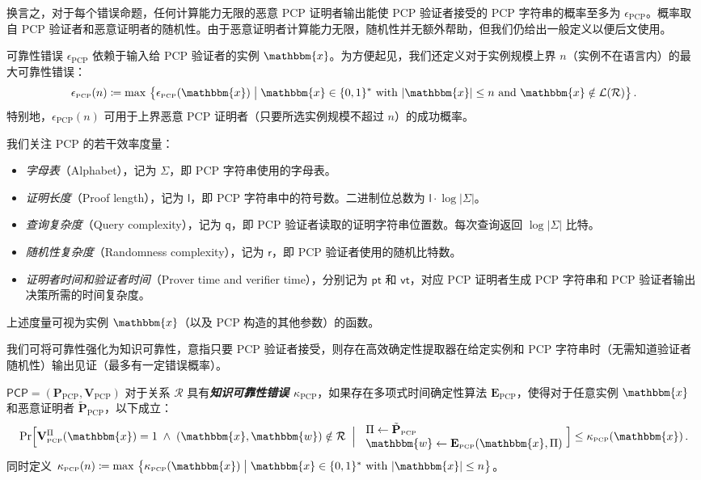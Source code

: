 \documentclass[american,singlepageview]{snargs-book-zh}
\renewcommand{\enspace}{\ensuremath{\thinspace}}
\newcommand{\defemph}[1]{\textbf{\emph{#1}}}
\newcommand{\Bits}{\{0,1\}}
\newcommand{\Malicious}[1]{\tilde{#1}}
\newcommand{\DefineEqual}{\coloneqq}
\newcommand{\StateExperiment}[1]{
\!\begin{array}{l}
#1
\end{array}\!}
\newcommand{\Cardinality}[1]{\left|{#1}\right|}
\newcommand{\SomeSize}[1]{|#1|}
\newcommand{\Relation}{\mathcal{R}}
\newcommand{\Language}{\mathcal{L}}
\newcommand{\GetLanguage}[1]{\Language(#1)}
\newcommand{\Instance}{\mathbbm{x}}
\newcommand{\Witness}{\mathbbm{w}}
\newcommand{\InstanceSize}{n}
\newcommand{\ProtoProver}{P}
\newcommand{\ProtoVerifier}{V}
\newcommand{\ProtoExtractor}{E}
\newcommand{\ProtoSoundnessError}{\epsilon}
\newcommand{\ProtoKnowledgeError}{\kappa}
\newcommand{\ProtoAlphabet}{\Sigma}
\newcommand{\ProtoProofLength}{\mathsf{l}}
\newcommand{\ProtoQueryComplexity}{\mathsf{q}}
\newcommand{\ProtoRandomnessComplexity}{\mathsf{r}}
\newcommand{\ProtoProverTime}{\mathsf{pt}}
\newcommand{\ProtoVerifierTime}{\mathsf{vt}}
\newcommand{\PCPSymbol}{\mathsf{PCP}}
\newcommand{\PCPSubscript}{\scriptscriptstyle\mathrm{PCP}}
\newcommand{\PCPFormat}[1]{\mathbf{#1}}
\newcommand{\PCPProver}{\PCPFormat{\ProtoProver}_{\PCPSubscript}}
\newcommand{\PCPVerifier}{\PCPFormat{\ProtoVerifier}_{\PCPSubscript}}
\newcommand{\PCPExtractor}{\PCPFormat{\ProtoExtractor}_{\PCPSubscript}}
\newcommand{\PCPMaliciousProver}{\Malicious{\PCPFormat{\ProtoProver}}_{\PCPSubscript}}
\newcommand{\PCPSystem}{(\PCPProver,\PCPVerifier)}
\newcommand{\PCPString}{\Pi}
\newcommand{\PCPSoundnessError}{\ProtoSoundnessError_{\PCPSubscript}}
\newcommand{\PCPKnowledgeError}{\ProtoKnowledgeError_{\PCPSubscript}}
\newcommand{\PCPAlphabet}{\ProtoAlphabet}
\newcommand{\PCPProofLength}{\ProtoProofLength}
\newcommand{\PCPRandomnessComplexity}{\ProtoRandomnessComplexity}
\newcommand{\PCPQueryComplexity}{\ProtoQueryComplexity}
\newcommand{\PCPProverTime}{\ProtoProverTime}
\newcommand{\PCPVerifierTime}{\ProtoVerifierTime}
\newcommand{\MaxSoundness}[1]{\max\, \big\{ #1 \;\big\vert\;\Instance \in \Bits^{*} \text{ with } \SomeSize{\Instance} \leq \InstanceSize \text{ and } \Instance \notin \GetLanguage{\Relation} \big\}}
\newcommand{\MaxKnowledge}[1]{\max\, \big\{ #1 \;\big\vert\;\Instance \in \Bits^{*} \text{ with } \SomeSize{\Instance} \leq \InstanceSize \big\}}
\begin{document}
换言之，对于每个错误命题，任何计算能力无限的恶意 PCP 证明者输出能使 PCP 验证者接受的 PCP 字符串的概率至多为 $\PCPSoundnessError$。概率取自 PCP 验证者和恶意证明者的随机性。由于恶意证明者计算能力无限，随机性并无额外帮助，但我们仍给出一般定义以便后文使用。

可靠性错误 $\PCPSoundnessError$ 依赖于输入给 PCP 验证者的实例 $\Instance$。为方便起见，我们还定义对于实例规模上界 $\InstanceSize$（实例不在语言内）的最大可靠性错误：
\[
\PCPSoundnessError(\InstanceSize)
\DefineEqual
\MaxSoundness{\PCPSoundnessError(\Instance)}
\enspace.
\]
特别地，$\PCPSoundnessError(\InstanceSize)$ 可用于上界恶意 PCP 证明者（只要所选实例规模不超过 $\InstanceSize$）的成功概率。

我们关注 PCP 的若干效率度量：
\begin{itemize}
  \item \emph{字母表}（Alphabet），记为 $\PCPAlphabet$，即 PCP 字符串使用的字母表。
  \item \emph{证明长度}（Proof length），记为 $\PCPProofLength$，即 PCP 字符串中的符号数。二进制位总数为 $\PCPProofLength \cdot \log\Cardinality{\PCPAlphabet}$。
  \item \emph{查询复杂度}（Query complexity），记为 $\PCPQueryComplexity$，即 PCP 验证者读取的证明字符串位置数。每次查询返回 $\log\Cardinality{\PCPAlphabet}$ 比特。
  \item \emph{随机性复杂度}（Randomness complexity），记为 $\PCPRandomnessComplexity$，即 PCP 验证者使用的随机比特数。
  \item \emph{证明者时间和验证者时间}（Prover time and verifier time），分别记为 $\PCPProverTime$ 和 $\PCPVerifierTime$，对应 PCP 证明者生成 PCP 字符串和 PCP 验证者输出决策所需的时间复杂度。
\end{itemize}
上述度量可视为实例 $\Instance$（以及 PCP 构造的其他参数）的函数。

我们可将可靠性强化为知识可靠性，意指只要 PCP 验证者接受，则存在高效确定性提取器在给定实例和 PCP 字符串时（无需知道验证者随机性）输出见证（最多有一定错误概率）。

\begin{definition}
\label{definition:pcp-knowledge-soundness}
$\PCPSymbol=\PCPSystem$ 对于关系 $\Relation$ 具有\defemph{知识可靠性错误 $\PCPKnowledgeError$}，如果存在多项式时间确定性算法 $\PCPExtractor$，使得对于任意实例 $\Instance$ 和恶意证明者 $\PCPMaliciousProver$，以下成立：
\[
\Pr\Bigl[
\PCPVerifier^{\PCPString}(\Instance)=1
\;\land\;
(\Instance,\Witness)\notin\Relation
\;\Bigm|\;
\StateExperiment{
  \PCPString \gets \PCPMaliciousProver \\
  \Witness \gets \PCPExtractor(\Instance,\PCPString)
}
\Bigr]
\le
\PCPKnowledgeError(\Instance)
\enspace.
\]
同时定义 $\PCPKnowledgeError(\InstanceSize)\DefineEqual \MaxKnowledge{\PCPKnowledgeError(\Instance)}$。
\end{definition}
\end{document}
